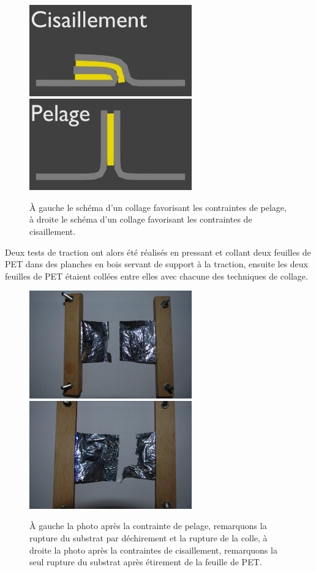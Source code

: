 \documentclass[a4paper,11pt]{article}
\begin{document}
\begin{figure}[H]
	\centering
 \includegraphics[width=7cm]{../Images/colle_cisaillement.png}
 \includegraphics[width=7cm]{../Images/colle_pelage.png}
 \caption{À gauche le schéma d'un collage favorisant les contraintes de pelage, à droite le schéma d'un collage favorisant les contraintes de cisaillement.}
\end{figure}

Deux tests de traction ont alors été réalisés en pressant et collant deux feuilles de PET dans des planches en bois servant de support à la traction, ensuite les deux feuilles de PET étaient collées entre elles avec chacune des techniques de collage.

\begin{figure}[H]
	\centering
 \includegraphics[width=7cm]{../Images/test_pelage.png}
 \includegraphics[width=7cm]{../Images/test_cisaillement.png}
 \caption{À gauche la photo après la contrainte de pelage, remarquons la rupture du substrat par déchirement et la rupture de la colle, à droite la photo après la contraintes de cisaillement, remarquons la seul rupture du substrat après étirement de la feuille de PET.}
\end{figure}
\end{document}
